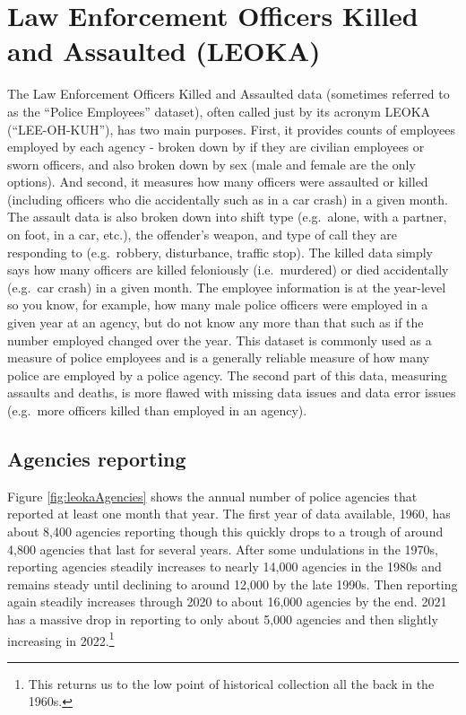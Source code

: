 \documentclass[
]{krantz}
\begin{document}
\chapter{Law Enforcement Officers Killed and Assaulted
(LEOKA)}\label{leoka}

The Law Enforcement Officers Killed and Assaulted data
(sometimes referred to as the ``Police Employees'' dataset),
often called just by its acronym LEOKA (``LEE-OH-KUH''), has
two main purposes. First, it provides counts of employees
employed by each agency - broken down by if they are
civilian employees or sworn officers, and also broken down
by sex (male and female are the only options). And second,
it measures how many officers were assaulted or killed
(including officers who die accidentally such as in a car
crash) in a given month. The assault data is also broken
down into shift type (e.g.~alone, with a partner, on foot,
in a car, etc.), the offender's weapon, and type of call
they are responding to (e.g.~robbery, disturbance, traffic
stop). The killed data simply says how many officers are
killed feloniously (i.e.~murdered) or died accidentally
(e.g.~car crash) in a given month. The employee information
is at the year-level so you know, for example, how many male
police officers were employed in a given year at an agency,
but do not know any more than that such as if the number
employed changed over the year. This dataset is commonly
used as a measure of police employees and is a generally
reliable measure of how many police are employed by a police
agency. The second part of this data, measuring assaults and
deaths, is more flawed with missing data issues and data
error issues (e.g.~more officers killed than employed in an
agency).

\section{Agencies reporting}\label{agencies-reporting-3}

Figure \ref{fig:leokaAgencies} shows the annual number of
police agencies that reported at least one month that year.
The first year of data available, 1960, has about 8,400
agencies reporting though this quickly drops to a trough of
around 4,800 agencies that last for several years. After
some undulations in the 1970s, reporting agencies steadily
increases to nearly 14,000 agencies in the 1980s and remains
steady until declining to around 12,000 by the late 1990s.
Then reporting again steadily increases through 2020 to
about 16,000 agencies by the end. 2021 has a massive drop in
reporting to only about 5,000 agencies and then slightly
increasing in 2022.\footnote{This returns us to the low
  point of historical collection all the back in the 1960s.}
\end{document}
